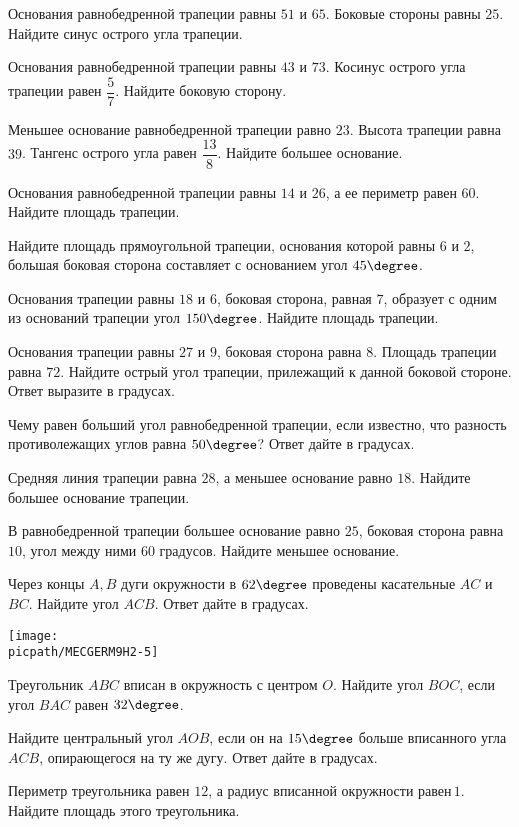 \begin{class}[number=5]
	\begin{listofex}
		\item Основания равнобедренной трапеции равны \(51\) и \(65\). Боковые стороны равны \(25\). Найдите синус острого угла трапеции.
		\item Основания равнобедренной трапеции равны \(43\) и \(73\). Косинус острого угла трапеции равен \(\dfrac{  5}{ 7 }\).  Найдите боковую сторону.
		\item Меньшее основание равнобедренной трапеции равно \(23\). Высота трапеции равна \(39\). Тангенс острого угла равен \(\dfrac{ 13 }{ 8 }\). Найдите большее основание.
		\item Основания равнобедренной трапеции равны \(14\) и \(26\), а ее периметр равен \(60\). Найдите площадь трапеции.
		\item Найдите площадь прямоугольной трапеции, основания которой равны \(6\) и \(2\), большая боковая сторона составляет с основанием угол \(45\degree \).
		\item Основания трапеции равны \(18\) и \(6\), боковая сторона, равная \(7\), образует с одним из оснований трапеции угол \(150\degree \). Найдите площадь трапеции.
		\item Основания трапеции равны \(27\) и \(9\), боковая сторона равна \(8\). Площадь трапеции равна \(72\). Найдите острый угол трапеции, прилежащий к данной боковой стороне. Ответ выразите в градусах.
		\item Чему равен больший угол равнобедренной трапеции, если известно, что разность противолежащих углов равна \(50\degree \)? Ответ дайте в градусах.
		\item Средняя линия трапеции равна \(28\), а меньшее основание равно \(18\). Найдите большее основание трапеции.
		\item В равнобедренной трапеции большее основание равно \(25\), боковая сторона равна \(10\), угол между ними \(60\) градусов. Найдите меньшее основание.
		\item
		\begin{minipage}[t]{\bodywidth}
			Через концы \(A, B\) дуги окружности в \(62\degree \) проведены касательные \(AC\) и \(BC\). Найдите угол \(ACB\). Ответ дайте в градусах.
		\end{minipage}
		\hspace{0.02\linewidth}
		\begin{minipage}[t]{\picwidth}
			\texttt{[image: \\picpath/MECGERM9H2-5]}
		\end{minipage}
		\item Треугольник \(ABC\) вписан в окружность с центром \(O\). Найдите угол \(BOC\), если угол \(BAC\) равен \(32\degree \).
		\item Найдите центральный угол \(AOB\), если он на \(15\degree \) больше вписанного угла \(ACB\), опирающегося на ту же дугу. Ответ дайте в градусах.
		\item Периметр треугольника равен \(12\), а радиус вписанной окружности равен \(1\). Найдите площадь этого треугольника.
		
		
		
		
	\end{listofex}
\end{class}
